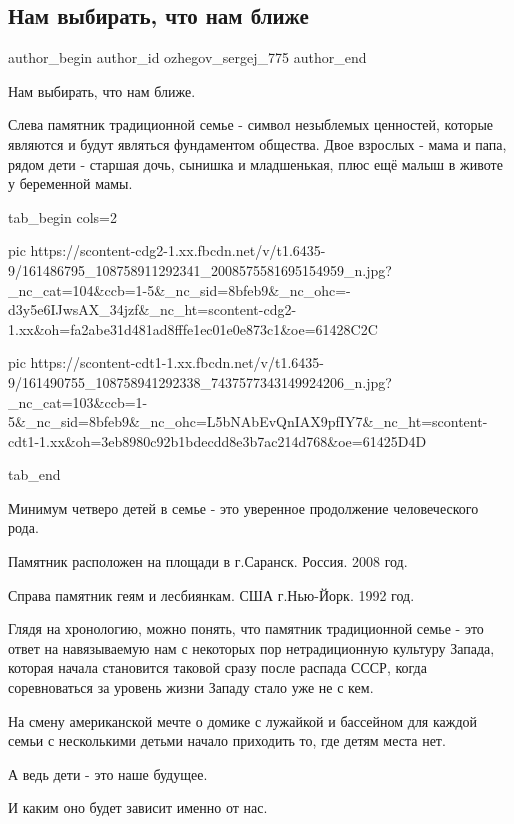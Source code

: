  
 
 
 
 
 
\subsection{Нам выбирать, что нам ближе}
\label{sec:17_03_2021.fb.ozhegov_sergej_775.1.cennosti_semja}
 
\ifcmt
 author_begin
   author_id ozhegov_sergej_775
 author_end
\fi

Нам выбирать, что нам ближе.

Слева памятник традиционной семье - символ незыблемых ценностей, которые
являются и будут являться фундаментом общества. Двое взрослых - мама и папа,
рядом дети - старшая дочь, сынишка и младшенькая, плюс ещё малыш в животе у
беременной мамы. 


\ifcmt
  tab_begin cols=2

     pic https://scontent-cdg2-1.xx.fbcdn.net/v/t1.6435-9/161486795_108758911292341_2008575581695154959_n.jpg?_nc_cat=104&ccb=1-5&_nc_sid=8bfeb9&_nc_ohc=-d3y5e6IJwsAX_34jzf&_nc_ht=scontent-cdg2-1.xx&oh=fa2abe31d481ad8fffe1ec01e0e873c1&oe=61428C2C

     pic https://scontent-cdt1-1.xx.fbcdn.net/v/t1.6435-9/161490755_108758941292338_7437577343149924206_n.jpg?_nc_cat=103&ccb=1-5&_nc_sid=8bfeb9&_nc_ohc=L5bNAbEvQnIAX9pfIY7&_nc_ht=scontent-cdt1-1.xx&oh=3eb8980c92b1bdecdd8e3b7ac214d768&oe=61425D4D

  tab_end
\fi

Минимум четверо детей в семье - это уверенное продолжение человеческого рода.

Памятник расположен на площади в г.Саранск. Россия. 2008 год.

Справа памятник геям и лесбиянкам. США г.Нью-Йорк. 1992 год.

Глядя на хронологию,  можно понять, что памятник традиционной семье - это ответ
на навязываемую нам с некоторых пор нетрадиционную культуру Запада, которая
начала становится таковой сразу после распада СССР, когда соревноваться за
уровень жизни Западу стало уже не с кем.

На смену американской мечте о домике с лужайкой и бассейном для каждой семьи с
несколькими детьми начало приходить то, где детям места нет. 

А ведь дети - это наше будущее. 

И каким оно будет зависит именно от нас.
